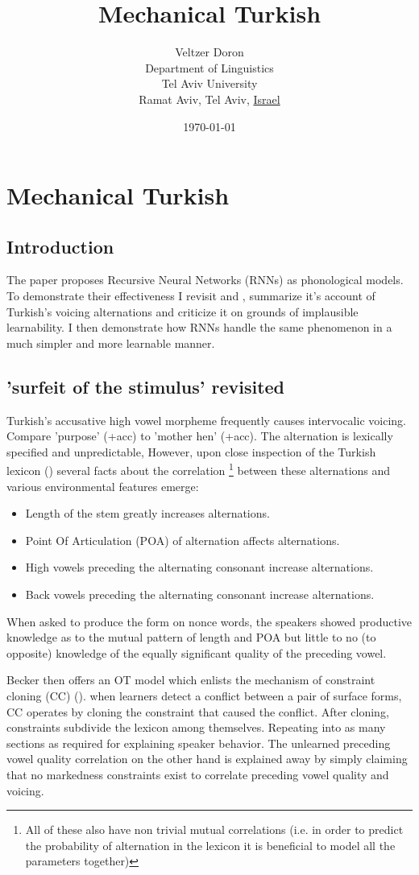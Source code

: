 \documentclass[a4paper,12pt]{article}
\author{ Veltzer Doron\\
Department of Linguistics\\
Tel Aviv University\\
Ramat Aviv, Tel Aviv, \underline{Israel} }
\date{\today}
\title{Mechanical Turkish}
\begin{document}
\section{Mechanical Turkish}

\subsection{Introduction}
The paper proposes Recursive Neural Networks (RNNs) as phonological models. To demonstrate their
effectiveness I revisit \cite{becker_phonological_2009} and \cite{becker_surfeit_2011}, summarize
it's account of Turkish's voicing alternations and criticize it on grounds of implausible
learnability. I then demonstrate how RNNs handle the same phenomenon in a much simpler and
more learnable manner.

\subsection{'surfeit of the stimulus' revisited}
Turkish's accusative high vowel morpheme frequently causes intervocalic voicing. Compare
\textipa{[amatS]} 'purpose' \textipa{[amatSW]} (+acc) to \textipa{[anatS]} 'mother hen'
\textipa{[anadZW]} (+acc). The alternation is lexically specified and unpredictable, However, upon
close inspection of the Turkish lexicon (\cite{inkelas_turkish_2000}) several facts about the
correlation \footnote{All of these also have non trivial mutual correlations (i.e. in order to
predict the probability of alternation in the lexicon it is beneficial to model all the parameters
together)} between these alternations and various environmental features emerge:
\begin{itemize}
  \item Length of the stem greatly increases alternations.
  \item Point Of Articulation (POA) of alternation affects alternations.
  \item High vowels preceding the alternating consonant increase alternations.
  \item Back vowels preceding the alternating consonant increase alternations.
\end{itemize}

When asked to produce the form on nonce words, the speakers showed productive knowledge as to the
mutual pattern of length and POA but little to no (to opposite) knowledge of the equally significant
quality of the preceding vowel.

Becker then offers an OT model which enlists the mechanism of constraint cloning (CC)
(\cite{pater_locus_2007}). when learners detect a conflict between a pair of surface
forms, CC operates by cloning the constraint that caused the conflict. After cloning, constraints subdivide the lexicon among themselves. Repeating into as many sections as required for explaining
speaker behavior. The unlearned preceding vowel quality correlation on the other hand is explained away by simply
claiming that no markedness constraints exist to correlate preceding vowel quality and voicing.
\end{document}
